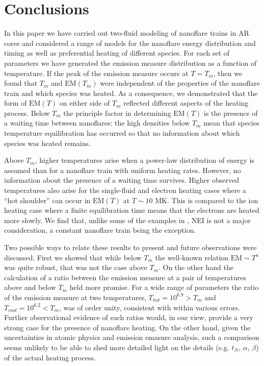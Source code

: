 \documentclass[preprint,linenumbers]{aastex}
\begin{document}
	\section{Conclusions}
	\label{sec:conclusions}
	\par In this paper we have carried out two-fluid modeling of nanoflare trains in AR cores and considered a range of models for the nanoflare energy distribution and timing as well as preferential heating of different species. For each set of parameters we have generated the emission measure distribution as a function of temperature. If the peak of the emission measure occurs at $T = T_m$, then we found that $T_m$ and $\mathrm{EM}(T_m)$ were independent of the properties of the nanoflare train and which species was heated. As a consequence, we demonstrated that the form of $\mathrm{EM}(T)$ on either side of $T_m$ reflected different aspects of the heating process. Below $T_m$ the principle factor in determining $\mathrm{EM}(T)$ is the presence of a waiting time between nanoflares: the high densities below $T_m$ mean that species temperature equilibration has occurred so that no information about which species was heated remains.
	\par Above $T_m$, higher temperatures arise when a power-law distribution of energy is assumed than for a nanoflare train with uniform heating rates. However, no information about the presence of a waiting time survives. Higher observed temperatures also arise for the single-fluid and electron heating cases where a ``hot shoulder'' can occur in $\mathrm{EM}(T)$ at $T\sim10$ MK. This is compared to the ion heating case where a finite equilibration time means that the electrons are heated more slowly. We find that, unlike some of the examples in , NEI is not a major consideration, a constant nanoflare train being the exception.
	\par Two possible ways to relate these results to present and future observations were discussed. First we showed that while below $T_m$ the well-known relation $\mathrm{EM}\sim T^a$ was quite robust, that was not the case above $T_m$. On the other hand the calculation of a ratio between the emission measure at a pair of temperatures above and below $T_m$ held more promise. For a wide range of parameters the ratio of the emission measure at two temperatures, $T_{hot}=10^{6.9}>T_m$ and $T_{cool}=10^{6.2}<T_m$, was of order unity, consistent with \citet{brosius_pervasive_2014} within various errors. Further observational evidence of such ratios would, in our view, provide a very strong case for the presence of nanoflare heating. On the other hand, given the uncertainties in atomic physics and emission emasure analysis, such a comparison seems unlikely to be able to shed more detailed light on the details (e.g. $t_N$, $\alpha$, $\beta$) of the actual heating process. 
\end{document}
